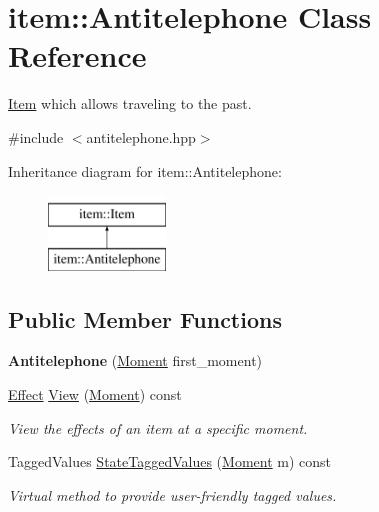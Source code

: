 \hypertarget{classitem_1_1_antitelephone}{}\section{item\+:\+:Antitelephone Class Reference}
\label{classitem_1_1_antitelephone}


\hyperlink{classitem_1_1_item}{Item} which allows traveling to the past.  




{\ttfamily \#include $<$antitelephone.\+hpp$>$}

Inheritance diagram for item\+:\+:Antitelephone\+:\begin{figure}[H]
\begin{center}
\leavevmode
\includegraphics[height=2.000000cm]{classitem_1_1_antitelephone}
\end{center}
\end{figure}
\subsection*{Public Member Functions}
\begin{DoxyCompactItemize}
\item 
\mbox{\label{classitem_1_1_antitelephone_a832d79223e555ae7dd69d11377392731}} 
{\bfseries Antitelephone} (\hyperlink{classtimeplane_1_1_moment}{Moment} first\+\_\+moment)
\item 
\hyperlink{classitem_1_1_effect}{Effect} \hyperlink{classitem_1_1_antitelephone_ae8f9abbbb65d23970fb3b61393bda141}{View} (\hyperlink{classtimeplane_1_1_moment}{Moment}) const
\begin{DoxyCompactList}\small\item\em View the effects of an item at a specific moment. \end{DoxyCompactList}\item 
Tagged\+Values \hyperlink{classitem_1_1_antitelephone_afe8ac703b5f19181f221afe07c05cae7}{State\+Tagged\+Values} (\hyperlink{classtimeplane_1_1_moment}{Moment} m) const
\begin{DoxyCompactList}\small\item\em Virtual method to provide user-\/friendly tagged values. \end{DoxyCompactList}\end{DoxyCompactItemize}
